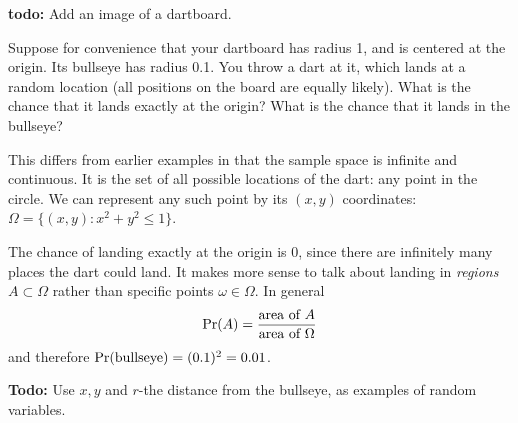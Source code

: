 {\bf todo:} Add an image of a dartboard.

Suppose for convenience that your dartboard has radius 1, and is
centered at the origin. Its bullseye has radius 0.1. You throw a dart
at it, which lands at a random location (all positions on the board
are equally likely). What is the chance that it lands exactly at the
origin? What is the chance that it lands in the bullseye?

This differs from earlier examples in that the sample space is infinite and continuous. It is the set of all possible locations of the dart: any point in the circle. We can represent any such point by its $(x,y)$ coordinates: $\Omega = \{(x,y): x^2 + y^2 \leq 1\}$.

The chance of landing exactly at the origin is 0, since there are infinitely many places the dart could land. It makes more sense to talk about landing in {\it regions} $A \subset \Omega$ rather than specific points $\omega \in \Omega$. In general
$$ \mbox{\rm Pr}(A) = \frac{\mbox{area of $A$}}{\mbox{area of $\Omega$}} $$
and therefore $\mbox{\rm Pr}(\mbox{bullseye}) = (0.1)^2 = 0.01$.

{\bf Todo:} Use $x,y$ and $r$-the distance from the bullseye, 
as examples of random variables.



